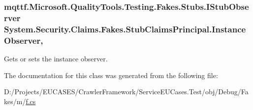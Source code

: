 \hypertarget{class_system_1_1_security_1_1_claims_1_1_fakes_1_1_stub_claims_principal_a63d6b123be7ae83a5f8b9859339fb579}{
\subsubsection[{Instance\-Observer}]{\setlength{\rightskip}{0pt plus 5cm}mqttf.\-Microsoft.\-Quality\-Tools.\-Testing.\-Fakes.\-Stubs.\-I\-Stub\-Observer System.\-Security.\-Claims.\-Fakes.\-Stub\-Claims\-Principal.\-Instance\-Observer\hspace{0.3cm}{\ttfamily [get]}, {\ttfamily [set]}}}\label{class_system_1_1_security_1_1_claims_1_1_fakes_1_1_stub_claims_principal_a63d6b123be7ae83a5f8b9859339fb579}


Gets or sets the instance observer.



The documentation for this class was generated from the following file\-:\begin{DoxyCompactItemize}
\item 
D\-:/\-Projects/\-E\-U\-C\-A\-S\-E\-S/\-Crawler\-Framework/\-Service\-E\-U\-Cases.\-Test/obj/\-Debug/\-Fakes/m/\hyperlink{m_2f_8cs}{f.\-cs}\end{DoxyCompactItemize}
